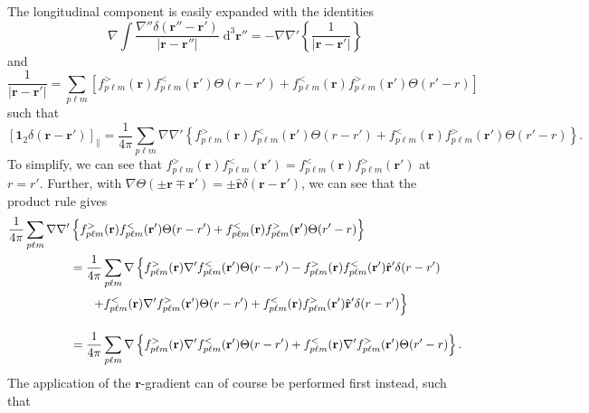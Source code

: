 \documentclass{article}
\begin{document}
The longitudinal component is easily expanded with the identities
\begin{equation}
\nabla\int\frac{\nabla''\delta(\mathbf{r}''-\mathbf{r}')}{|\mathbf{r} - \mathbf{r}''|}\;\mathrm{d}^3\mathbf{r}'' = -\nabla\nabla'\left\{\frac{1}{|\mathbf{r} - \mathbf{r}'|}\right\}
\end{equation}
and
\begin{equation}
\frac{1}{|\mathbf{r} - \mathbf{r}'|} = \sum_{p\ell m}\left[f_{p\ell m}^>(\mathbf{r})f_{p\ell m}^<(\mathbf{r}')\Theta(r - r') + f_{p\ell m}^<(\mathbf{r})f_{p\ell m}^>(\mathbf{r}')\Theta(r' - r)\right]
\end{equation}
such that
\begin{equation}
\left[\bm{1}_2\delta(\mathbf{r} - \mathbf{r}')\right]_\parallel = \frac{1}{4\pi}\sum_{p\ell m}\nabla\nabla'\left\{f_{p\ell m}^>(\mathbf{r}) f_{p\ell m}^<(\mathbf{r}')\Theta(r - r') + f_{p\ell m}^<(\mathbf{r})f_{p\ell m}^>(\mathbf{r}')\Theta(r' - r)\right\}.
\end{equation}
To simplify, we can see that $f_{p\ell m}^>(\mathbf{r}) f_{p\ell m}^<(\mathbf{r}') = f_{p\ell m}^<(\mathbf{r})f_{p\ell m}^>(\mathbf{r}')$ at $r = r'$. Further, with $\nabla\Theta(\pm\mathbf{r} \mp \mathbf{r}') = \pm\hat{\mathbf{r}}\delta(\mathbf{r} - \mathbf{r}')$, we can see that the product rule gives
\begin{equation}
\begin{split}
\frac{1}{4\pi}\sum_{p\ell m}\nabla\nabla'&\left\{f_{p\ell m}^>(\mathbf{r}) f_{p\ell m}^<(\mathbf{r}')\Theta(r - r') + f_{p\ell m}^<(\mathbf{r})f_{p\ell m}^>(\mathbf{r}')\Theta(r' - r)\right\}\\
&= \frac{1}{4\pi}\sum_{p\ell m}\nabla\left\{f_{p\ell m}^>(\mathbf{r})\nabla'f_{p\ell m}^<(\mathbf{r}')\Theta(r - r') - f_{p\ell m}^>(\mathbf{r})f_{p\ell m}^<(\mathbf{r}')\hat{\mathbf{r}}'\delta(r - r')\right.\\
&\hspace{0.05\textwidth}\left.+ f_{p\ell m}^<(\mathbf{r})\nabla'f_{p\ell m}^>(\mathbf{r}')\Theta(r - r') + f_{p\ell m}^<(\mathbf{r})f_{p\ell m}^>(\mathbf{r}')\hat{\mathbf{r}}'\delta(r - r')\right\}\\[1.0em]
&= \frac{1}{4\pi}\sum_{p\ell m}\nabla\left\{f_{p\ell m}^>(\mathbf{r})\nabla'f_{p\ell m}^<(\mathbf{r}')\Theta(r - r') + f_{p\ell m}^<(\mathbf{r})\nabla'f_{p\ell m}^>(\mathbf{r}')\Theta(r' - r)\right\}.
\end{split}
\end{equation}
The application of the $\mathbf{r}$-gradient can of course be performed first instead, such that
\end{document}
